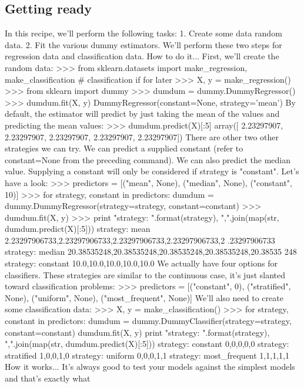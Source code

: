 \subsection*{Getting ready}
In this recipe, we'll perform the following tasks:
1. Create some data random data.
2. Fit the various dummy estimators.
We'll perform these two steps for regression data and classification data.
How to do it...
First, we'll create the random data:
>>> from sklearn.datasets import make_regression, make_classification
# classification if for later
>>> X, y = make_regression()
>>> from sklearn import dummy
>>> dumdum = dummy.DummyRegressor()
>>> dumdum.fit(X, y)
DummyRegressor(constant=None, strategy='mean')
By default, the estimator will predict by just taking the mean of the values and predicting the
mean values:
>>> dumdum.predict(X)[:5]
array([ 2.23297907, 2.23297907, 2.23297907, 2.23297907,
2.23297907])
There are other two other strategies we can try. We can predict a supplied constant (refer to
constant=None from the preceding command). We can also predict the median value.
Supplying a constant will only be considered if strategy is "constant".
Let's have a look:
>>> predictors = [("mean", None),
("median", None),
("constant", 10)]
>>> for strategy, constant in predictors:
dumdum = dummy.DummyRegressor(strategy=strategy,
constant=constant)
>>> dumdum.fit(X, y)
>>> print "strategy: {}".format(strategy), ",".join(map(str,
dumdum.predict(X)[:5]))
strategy: mean 2.23297906733,2.23297906733,2.23297906733,2.23297906733,2
.23297906733
strategy: median 20.38535248,20.38535248,20.38535248,20.38535248,20.38535
248
strategy: constant 10.0,10.0,10.0,10.0,10.0
We actually have four options for classifiers. These strategies are similar to the continuous case,
it's just slanted toward classification problems:
>>> predictors = [("constant", 0),
("stratified", None),
("uniform", None),
("most_frequent", None)]
We'll also need to create some classification data:
>>> X, y = make_classification()
>>> for strategy, constant in predictors:
dumdum = dummy.DummyClassifier(strategy=strategy,
constant=constant)
dumdum.fit(X, y)
print "strategy: {}".format(strategy), ",".join(map(str,
dumdum.predict(X)[:5]))
strategy: constant 0,0,0,0,0
strategy: stratified 1,0,0,1,0
strategy: uniform 0,0,0,1,1
strategy: most_frequent 1,1,1,1,1
How it works...
It's always good to test your models against the simplest models and that's exactly what

